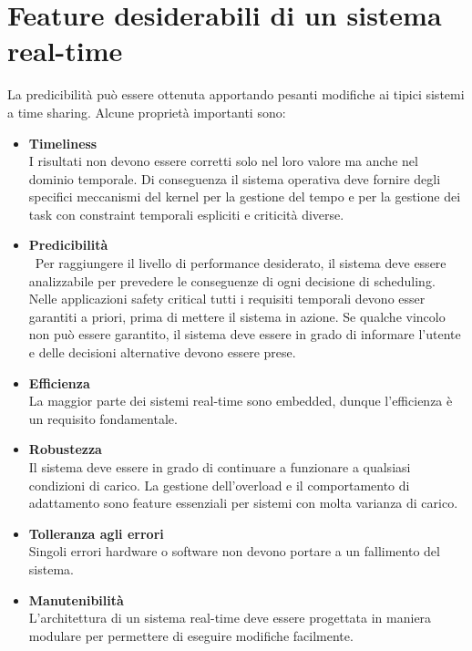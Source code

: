 \documentclass[12pt,openany,onesided]{book}
\begin{document}
\section{Feature desiderabili di un sistema real-time}
La predicibilità può essere ottenuta apportando pesanti modifiche ai tipici sistemi a time sharing.
Alcune proprietà importanti sono:
\begin{itemize}
\item \textbf{Timeliness}\\
    I risultati non devono essere corretti solo nel loro valore ma anche nel dominio temporale.
    Di conseguenza il sistema operativa deve fornire degli specifici meccanismi del kernel per la gestione del tempo e 
    per la gestione dei task con constraint temporali espliciti e criticità diverse.
\item \textbf{Predicibilità}\\\
    Per raggiungere il livello di performance desiderato, il sistema deve essere analizzabile per prevedere le conseguenze di ogni decisione di scheduling.
    Nelle applicazioni safety critical tutti i requisiti temporali devono esser garantiti a priori, prima di mettere il sistema in azione.
    Se qualche vincolo non può essere garantito, il sistema deve essere in grado di informare l'utente e delle decisioni alternative devono essere prese.
\item \textbf{Efficienza}\\
    La maggior parte dei sistemi real-time sono embedded, dunque l'efficienza è un requisito fondamentale.
\item \textbf{Robustezza}\\
    Il sistema deve essere in grado di continuare a funzionare a qualsiasi condizioni di carico. La gestione dell'overload e il comportamento di adattamento sono feature essenziali per sistemi con molta varianza di carico.
\item \textbf{Tolleranza agli errori}\\
    Singoli errori hardware o software non devono portare a un fallimento del sistema.
\item \textbf{Manutenibilità}\\
    L'architettura di un sistema real-time deve essere progettata in maniera modulare per permettere di eseguire modifiche facilmente.
\end{itemize}
\end{document}
